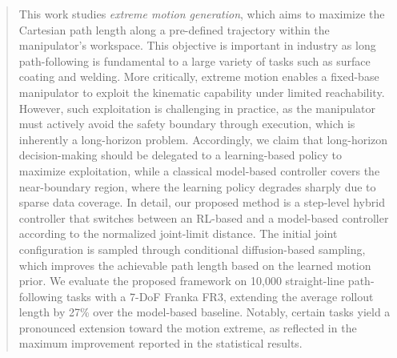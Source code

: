 \documentclass{svproc}
\newcommand{\wan}[1]{{\color{awesome}\begin{CJK*}{UTF8}{gkai}\small#1\end{CJK*}}}
\newcommand{\wanextra}[1]{{\color{blue}\begin{CJK*}{UTF8}{gkai}\small#1\end{CJK*}}}
\newcommand{\xinyi}[1]{{\color{darkorange}\begin{CJK*}{UTF8}{gkai}#1\end{CJK*}}}
\newcommand{\xinyitodo}[1]{{\color{darkgreen}\begin{CJK*}{UTF8}{gkai}#1\end{CJK*}}}
\begin{document}
\begin{abstract}
This work studies \textit{extreme motion generation}, which aims to maximize the Cartesian path length along a pre-defined trajectory within the manipulator's workspace. This objective is important in industry as long path-following is fundamental to a large variety of tasks such as surface coating and welding. More critically, extreme motion enables a fixed-base manipulator to exploit the kinematic capability under limited reachability. However, such exploitation is challenging in practice, as the manipulator must actively avoid the safety boundary through execution, which is inherently a long-horizon problem. Accordingly, we claim that long-horizon decision-making should be delegated to a learning-based policy to maximize exploitation, while a classical model-based controller covers the near-boundary region, where the learning policy degrades sharply due to sparse data coverage. In detail, our proposed method is a step-level hybrid controller that switches between an RL-based and a model-based controller according to the normalized joint-limit distance. The initial joint configuration is sampled through conditional diffusion-based sampling, which improves the achievable path length based on the learned motion prior. We evaluate the proposed framework on 10,000 straight-line path-following tasks with a 7-DoF Franka FR3, extending the average rollout length by 27\% over the model-based baseline. Notably, certain tasks yield a pronounced extension toward the motion extreme, as reflected in the maximum improvement reported in the statistical results.

\end{abstract}
\end{document}
